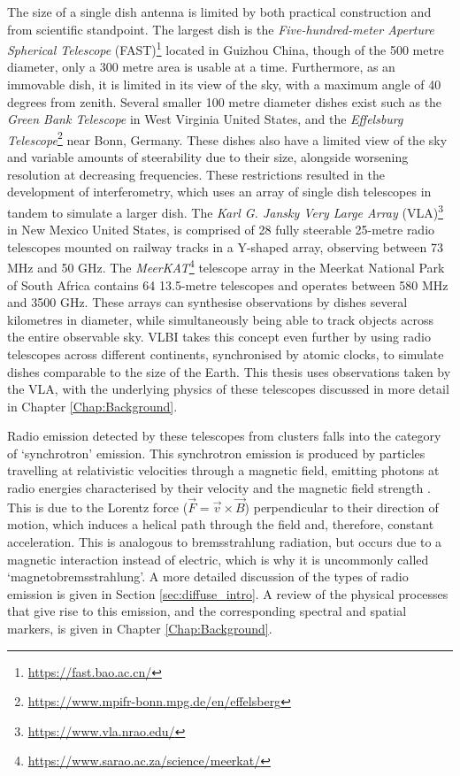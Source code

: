 The size of a single dish antenna is limited by both practical construction and from scientific standpoint. The largest dish is the \textit{Five-hundred-meter Aperture Spherical Telescope} (FAST)\footnote{\url{https://fast.bao.ac.cn/}} located in Guizhou China, though of the 500 metre diameter, only a 300 metre area is usable at a time. Furthermore, as an immovable dish, it is limited in its view of the sky, with a maximum angle of 40 degrees from zenith. Several smaller 100 metre diameter dishes exist such as the \textit{Green Bank Telescope} in West Virginia United States, and the \textit{Effelsburg Telescope}\footnote{\url{https://www.mpifr-bonn.mpg.de/en/effelsberg}} near Bonn, Germany. These dishes also have a limited view of the sky and variable amounts of steerability due to their size, alongside worsening resolution at decreasing frequencies. These restrictions resulted in the development of interferometry, which uses an array of single dish telescopes in tandem to simulate a larger dish. The \textit{Karl G. Jansky Very Large Array} (VLA)\footnote{\url{https://www.vla.nrao.edu/}} in New Mexico United States, is comprised of 28 fully steerable 25-metre radio telescopes mounted on railway tracks in a Y-shaped array, observing between 73 MHz and 50 GHz. The \textit{MeerKAT}\footnote{\url{https://www.sarao.ac.za/science/meerkat/}} telescope array in the Meerkat National Park of South Africa contains 64 13.5-metre telescopes and operates between 580 MHz and 3500 GHz. These arrays can synthesise observations by dishes several kilometres in diameter, while simultaneously being able to track objects across the entire observable sky. VLBI takes this concept even further by using radio telescopes across different continents, synchronised by atomic clocks, to simulate dishes comparable to the size of the Earth. This thesis uses observations taken by the VLA, with the underlying physics of these telescopes discussed in more detail in Chapter \ref{Chap:Background}. 

Radio emission detected by these telescopes from clusters falls into the category of `synchrotron' emission. This synchrotron emission is produced by particles travelling at relativistic velocities through a magnetic field, emitting photons at radio energies characterised by their velocity and the magnetic field strength \citep{Ferreti2012,Schneider2015}. This is due to the Lorentz force ($\vec F = \vec v \times \vec B$) perpendicular to their direction of motion, which induces a helical path through the field and, therefore, constant acceleration. This is analogous to bremsstrahlung radiation, but occurs due to a magnetic interaction instead of electric, which is why it is uncommonly called `magnetobremsstrahlung'. A more detailed discussion of the types of radio emission is given in Section \ref{sec:diffuse_intro}. A review of the physical processes that give rise to this emission, and the corresponding spectral and spatial markers, is given in Chapter \ref{Chap:Background}.

